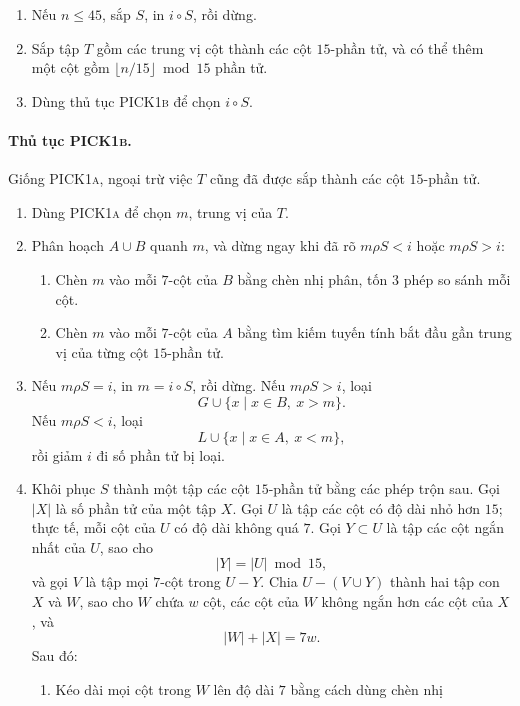 \documentclass[11pt]{article}
\newcommand{\PICKonea}{\textsc{PICK1a}}
\newcommand{\PICKoneb}{\textsc{PICK1b}}
\begin{document}
\begin{enumerate}
  \item Nếu \(n\le 45\), sắp \(S\), in \(i\circ S\), rồi dừng.
  \item Sắp tập \(T\) gồm các trung vị cột thành các cột \(15\)-phần tử, và có
  thể thêm một cột gồm \(\lfloor n/15\rfloor\bmod 15\) phần tử.
  \item Dùng thủ tục \PICKoneb{} để chọn \(i\circ S\).
\end{enumerate}

\paragraph{Thủ tục \PICKoneb.}
Giống \PICKonea, ngoại trừ việc \(T\) cũng đã được sắp thành các cột
\(15\)-phần tử.

\begin{enumerate}
  \item Dùng \PICKonea{} để chọn \(m\), trung vị của \(T\).
  \item Phân hoạch \(A\cup B\) quanh \(m\), và dừng ngay khi đã rõ
  \(m\rho S<i\) hoặc \(m\rho S>i\):
  \begin{enumerate}
    \item Chèn \(m\) vào mỗi \(7\)-cột của \(B\) bằng chèn nhị phân, tốn \(3\)
    phép so sánh mỗi cột.
    \item Chèn \(m\) vào mỗi \(7\)-cột của \(A\) bằng tìm kiếm tuyến tính bắt
    đầu gần trung vị của từng cột \(15\)-phần tử.
  \end{enumerate}
  \item Nếu \(m\rho S=i\), in \(m=i\circ S\), rồi dừng. Nếu \(m\rho S>i\), loại
  \[
    G\cup\{x\mid x\in B,\ x>m\}.
  \]
  Nếu \(m\rho S<i\), loại
  \[
    L\cup\{x\mid x\in A,\ x<m\},
  \]
  rồi giảm \(i\) đi số phần tử bị loại.
  \item Khôi phục \(S\) thành một tập các cột \(15\)-phần tử bằng các phép
  trộn sau. Gọi \(|X|\) là số phần tử của một tập \(X\). Gọi \(U\) là tập các
  cột có độ dài nhỏ hơn \(15\); thực tế, mỗi cột của \(U\) có độ dài không quá
  \(7\). Gọi \(Y\subset U\) là tập các cột ngắn nhất của \(U\), sao cho
  \[
    |Y|=|U|\bmod 15,
  \]
  và gọi \(V\) là tập mọi \(7\)-cột trong \(U-Y\). Chia
  \(U-(V\cup Y)\) thành hai tập con \(X\) và \(W\), sao cho \(W\) chứa \(w\)
  cột, các cột của \(W\) không ngắn hơn các cột của \(X\), và
  \[
    |W|+|X|=7w.
  \]
  Sau đó:
  \begin{enumerate}
    \item Kéo dài mọi cột trong \(W\) lên độ dài \(7\) bằng cách dùng chèn nhị

\end{enumerate}
\end{enumerate}
\end{document}
